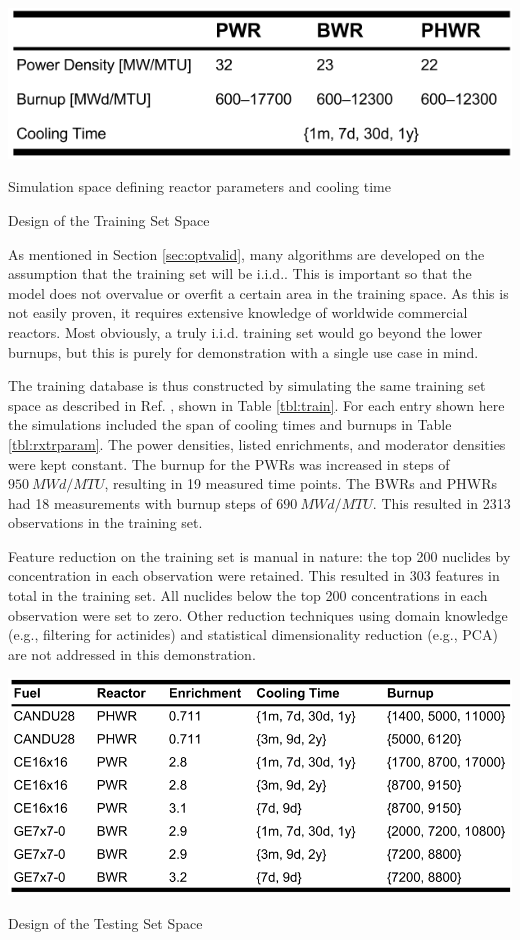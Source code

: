 \begin{table}[!hp]
  \begin{subtable}{\linewidth}
    \centering
    \includegraphics[width=0.7\linewidth]{./chapters/demo_method/TrainData2.png}
    \caption{Simulation space defining reactor parameters and cooling time}
    \label{tbl:rxtrparam}
  \end{subtable}%
  \caption{Design of the Training Set Space}
  \label{tbl:train}
\end{table}

As mentioned in Section \ref{sec:optvalid}, many algorithms are developed on
the assumption that the training set will be \acrfull{i.i.d.}. This is
important so that the model does not overvalue or overfit a certain area in the
training space. As this is not easily proven, it requires extensive knowledge
of worldwide commercial reactors. Most obviously, a truly \gls{i.i.d.} training
set would go beyond the lower burnups, but this is purely for demonstration
with a single use case in mind.  

The training database is thus constructed by simulating the same training set
space as described in Ref.  \cite{dayman_feasibility_2013}, shown in Table
\ref{tbl:train}. For each entry shown here the simulations included the span of
cooling times and burnups in Table \ref{tbl:rxtrparam}. The power densities,
listed enrichments, and moderator densities were kept constant. The burnup for
the \glspl{PWR} was increased in steps of $950\ MWd/MTU$, resulting in 19
measured time points. The \glspl{BWR} and \glspl{PHWR} had 18 measurements with
burnup steps of $690\ MWd/MTU$.  This resulted in 2313 observations in the
training set.

Feature reduction on the training set is manual in nature: the top 200 nuclides
by concentration in each observation were retained. This resulted in 303
features in total in the training set. All nuclides below the top 200
concentrations in each observation were set to zero. Other reduction techniques
using domain knowledge (e.g., filtering for actinides) and statistical
dimensionality reduction (e.g., \gls{PCA}) are not addressed in this
demonstration.

\begin{table}[!hbt]
  \centering
  \includegraphics[width=0.95\linewidth]{./chapters/demo_method/TestData.png}
  \caption{Design of the Testing Set Space}
  \label{tbl:test}
\end{table}

